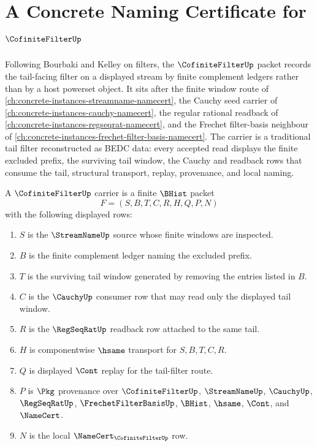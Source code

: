 \chapter{A Concrete Naming Certificate for $\CofiniteFilterUp$}
\label{ch:concrete-instances-cofinite-filter-namecert}

Following Bourbaki and Kelley on filters, the $\CofiniteFilterUp$ packet records the tail-facing filter on a displayed stream by finite complement ledgers rather than by a host powerset object. It sits after the finite window route of \autoref{ch:concrete-instances-streamname-namecert}, the Cauchy seed carrier of \autoref{ch:concrete-instances-cauchy-namecert}, the regular rational readback of \autoref{ch:concrete-instances-regseqrat-namecert}, and the Frechet filter-basis neighbour of \autoref{ch:concrete-instances-frechet-filter-basis-namecert}. The carrier is a traditional tail filter reconstructed as BEDC data: every accepted read displays the finite excluded prefix, the surviving tail window, the Cauchy and readback rows that consume the tail, structural transport, replay, provenance, and local naming.

\begin{definition}
\label{def:cofinite-filter-carrier}
A $\CofiniteFilterUp$ carrier is a finite $\BHist$ packet
$$
F=(S,B,T,C,R,H,Q,P,N)
$$
with the following displayed rows:
\begin{enumerate}
\item $S$ is the $\StreamNameUp$ source whose finite windows are inspected.
\item $B$ is the finite complement ledger naming the excluded prefix.
\item $T$ is the surviving tail window generated by removing the entries listed in $B$.
\item $C$ is the $\CauchyUp$ consumer row that may read only the displayed tail window.
\item $R$ is the $\RegSeqRatUp$ readback row attached to the same tail.
\item $H$ is componentwise $\hsame$ transport for $S,B,T,C,R$.
\item $Q$ is displayed $\Cont$ replay for the tail-filter route.
\item $P$ is $\Pkg$ provenance over $\CofiniteFilterUp$, $\StreamNameUp$, $\CauchyUp$, $\RegSeqRatUp$, $\FrechetFilterBasisUp$, $\BHist$, $\hsame$, $\Cont$, and $\NameCert$.
\item $N$ is the local $\NameCert_{\CofiniteFilterUp}$ row.
\end{enumerate}
\end{definition}

